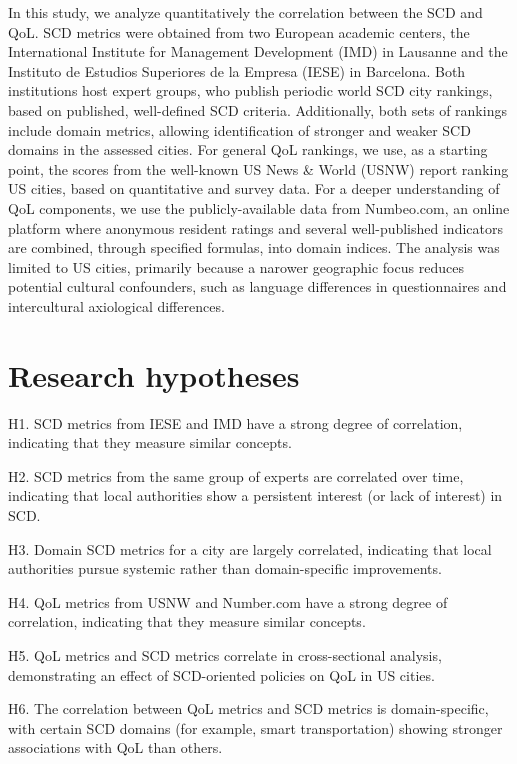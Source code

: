 \documentclass[
  english,
  12pt,
  a4paper,
]{scrartcl}
\begin{document}
In this study, we analyze quantitatively the correlation between the SCD
and QoL. SCD metrics were obtained from two European academic centers,
the International Institute for Management Development (IMD) in Lausanne
and the Instituto de Estudios Superiores de la Empresa (IESE) in
Barcelona. Both institutions host expert groups, who publish periodic
world SCD city rankings, based on published, well-defined SCD criteria.
Additionally, both sets of rankings include domain metrics, allowing
identification of stronger and weaker SCD domains in the assessed
cities. For general QoL rankings, we use, as a starting point, the
scores from the well-known US News \& World (USNW) report ranking US
cities, based on quantitative and survey data. For a deeper
understanding of QoL components, we use the publicly-available data from
Numbeo.com, an online platform where anonymous resident ratings and
several well-published indicators are combined, through specified
formulas, into domain indices. The analysis was limited to US cities,
primarily because a narower geographic focus reduces potential cultural
confounders, such as language differences in questionnaires and
intercultural axiological differences.

\section{Research hypotheses}\label{research-hypotheses}

H1. SCD metrics from IESE and IMD have a strong degree of correlation,
indicating that they measure similar concepts.

H2. SCD metrics from the same group of experts are correlated over time,
indicating that local authorities show a persistent interest (or lack of
interest) in SCD.

H3. Domain SCD metrics for a city are largely correlated, indicating
that local authorities pursue systemic rather than domain-specific
improvements.

H4. QoL metrics from USNW and Number.com have a strong degree of
correlation, indicating that they measure similar concepts.

H5. QoL metrics and SCD metrics correlate in cross-sectional analysis,
demonstrating an effect of SCD-oriented policies on QoL in US cities.

H6. The correlation between QoL metrics and SCD metrics is
domain-specific, with certain SCD domains (for example, smart
transportation) showing stronger associations with QoL than others.
\end{document}
